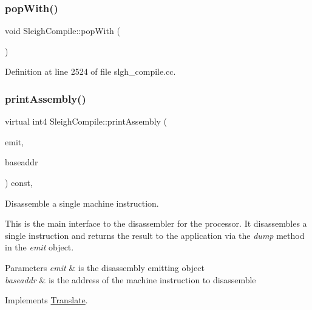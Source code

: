 \subsubsection{\texorpdfstring{popWith()}{popWith()}}
{\footnotesize\ttfamily void Sleigh\+Compile\+::pop\+With (\begin{DoxyParamCaption}\item[{void}]{ }\end{DoxyParamCaption})}



Definition at line 2524 of file slgh\+\_\+compile.\+cc.

\mbox{\label{class_sleigh_compile_a3bf70750db89c91c441bac3a58e15401}} 
\subsubsection{\texorpdfstring{printAssembly()}{printAssembly()}}
{\footnotesize\ttfamily virtual int4 Sleigh\+Compile\+::print\+Assembly (\begin{DoxyParamCaption}\item[{\mbox{\hyperlink{class_assembly_emit}{Assembly\+Emit}} \&}]{emit,  }\item[{const \mbox{\hyperlink{class_address}{Address}} \&}]{baseaddr }\end{DoxyParamCaption}) const\hspace{0.3cm}{\ttfamily [inline]}, {\ttfamily [virtual]}}



Disassemble a single machine instruction. 

This is the main interface to the disassembler for the processor. It disassembles a single instruction and returns the result to the application via the {\itshape dump} method in the {\itshape emit} object. 
\begin{DoxyParams}{Parameters}
{\em emit} & is the disassembly emitting object \\
\hline
{\em baseaddr} & is the address of the machine instruction to disassemble \\
\hline
\end{DoxyParams}


Implements \mbox{\hyperlink{class_translate_ac97443bb89e0c6bfb68caf9f48a8c85d}{Translate}}.



